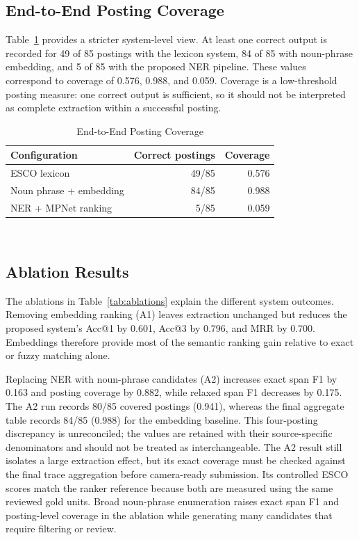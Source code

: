 \documentclass[conference]{IEEEtran}
\begin{document}
\subsection{End-to-End Posting Coverage}
Table~\ref{tab:coverage} provides a stricter system-level view. At least one correct output is recorded for 49 of 85 postings with the lexicon system, 84 of 85 with noun-phrase embedding, and 5 of 85 with the proposed NER pipeline. These values correspond to coverage of 0.576, 0.988, and 0.059. Coverage is a low-threshold posting measure: one correct output is sufficient, so it should not be interpreted as complete extraction within a successful posting.

\begin{table}[!t]
\caption{End-to-End Posting Coverage}
\label{tab:coverage}
\centering
\small
\begin{tabular}{lrr}
\toprule
Configuration & Correct postings & Coverage \\
\midrule
ESCO lexicon & 49/85 & 0.576 \\
Noun phrase + embedding & 84/85 & 0.988 \\
NER + MPNet ranking & 5/85 & 0.059 \\
\bottomrule
\end{tabular}
\\[1mm]
\par\vspace{1mm}{\footnotesize Source: corrected end-to-end fields in the Irish results table.}
\end{table}

\subsection{Ablation Results}
The ablations in Table~\ref{tab:ablations} explain the different system outcomes. Removing embedding ranking (A1) leaves extraction unchanged but reduces the proposed system's Acc@1 by 0.601, Acc@3 by 0.796, and MRR by 0.700. Embeddings therefore provide most of the semantic ranking gain relative to exact or fuzzy matching alone.

Replacing NER with noun-phrase candidates (A2) increases exact span F1 by 0.163 and posting coverage by 0.882, while relaxed span F1 decreases by 0.175. The A2 run records 80/85 covered postings (0.941), whereas the final aggregate table records 84/85 (0.988) for the embedding baseline. This four-posting discrepancy is unreconciled; the values are retained with their source-specific denominators and should not be treated as interchangeable. The A2 result still isolates a large extraction effect, but its exact coverage must be checked against the final trace aggregation before camera-ready submission. Its controlled ESCO scores match the ranker reference because both are measured using the same reviewed gold units. Broad noun-phrase enumeration raises exact span F1 and posting-level coverage in the ablation while generating many candidates that require filtering or review.
\end{document}

